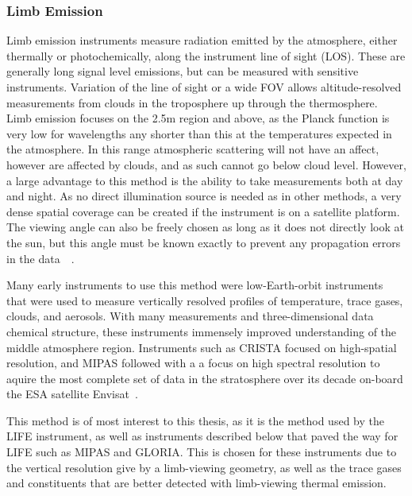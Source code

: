 \subsubsection{Limb Emission}
Limb emission instruments measure radiation emitted by the atmosphere, either thermally or photochemically, along the instrument line of sight (LOS). These are generally long signal level emissions, but can be measured with sensitive instruments. Variation of the line of sight or a wide FOV allows altitude-resolved measurements from clouds in the troposphere up through the thermosphere. Limb emission focuses on the 2.5\textmu m region and above, as the Planck function is very low for wavelengths any shorter than this at the temperatures expected in the atmosphere. In this range atmospheric scattering will not have an affect, however are affected by clouds, and as such cannot go below cloud level. However, a large advantage to this method is the ability to take measurements both at day and night. As no direct illumination source is needed as in other methods, a very dense spatial coverage can be created if the instrument is on a satellite platform. The viewing angle can also be freely chosen as long as it does not directly look at the sun, but this angle must be known exactly to prevent any propagation errors in the data~\citep{IR_limb_emission_measurements}~\citep{SPARC}.

Many early instruments to use this method were low-Earth-orbit instruments that were used to measure vertically resolved profiles of temperature, trace gases, clouds, and aerosols. With many measurements and three-dimensional data chemical structure, these instruments immensely improved understanding of the middle atmosphere region. Instruments such as CRISTA focused on high-spatial resolution, and MIPAS followed with a a focus on high spectral resolution to aquire the most complete set of data in the stratosphere over its decade on-board the ESA satellite Envisat~\cite{GLORIA_objectives}.

This method is of most interest to this thesis, as it is the method used by the LIFE instrument, as well as instruments described below that paved the way for LIFE such as MIPAS and GLORIA. This is chosen for these instruments due to the vertical resolution give by a limb-viewing geometry, as well as the trace gases and constituents that are better detected with limb-viewing thermal emission.

